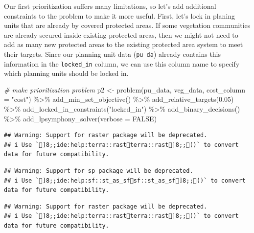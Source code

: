 \documentclass[
  12pt,
]{book}
\newenvironment{Shaded}{\begin{snugshade}}{\end{snugshade}}
\newcommand{\AttributeTok}[1]{\textcolor[rgb]{0.77,0.63,0.00}{#1}}
\newcommand{\CommentTok}[1]{\textcolor[rgb]{0.56,0.35,0.01}{\textit{#1}}}
\newcommand{\ConstantTok}[1]{\textcolor[rgb]{0.00,0.00,0.00}{#1}}
\newcommand{\FloatTok}[1]{\textcolor[rgb]{0.00,0.00,0.81}{#1}}
\newcommand{\FunctionTok}[1]{\textcolor[rgb]{0.00,0.00,0.00}{#1}}
\newcommand{\NormalTok}[1]{#1}
\newcommand{\OtherTok}[1]{\textcolor[rgb]{0.56,0.35,0.01}{#1}}
\newcommand{\SpecialCharTok}[1]{\textcolor[rgb]{0.00,0.00,0.00}{#1}}
\newcommand{\StringTok}[1]{\textcolor[rgb]{0.31,0.60,0.02}{#1}}
\begin{document}
Our first prioritization suffers many limitations, so let's add additional constraints to the problem to make it more useful. First, let's lock in planing units that are already by covered protected areas. If some vegetation communities are already secured inside existing protected areas, then we might not need to add as many new protected areas to the existing protected area system to meet their targets. Since our planning unit data (\texttt{pu\_da}) already contains this information in the \texttt{locked\_in} column, we can use this column name to specify which planning units should be locked in.

\begin{Shaded}
\begin{Highlighting}[]
\CommentTok{\# make prioritization problem}
\NormalTok{p2 }\OtherTok{\textless{}{-}} \FunctionTok{problem}\NormalTok{(pu\_data, veg\_data, }\AttributeTok{cost\_column =} \StringTok{"cost"}\NormalTok{) }\SpecialCharTok{\%\textgreater{}\%}
      \FunctionTok{add\_min\_set\_objective}\NormalTok{() }\SpecialCharTok{\%\textgreater{}\%}
      \FunctionTok{add\_relative\_targets}\NormalTok{(}\FloatTok{0.05}\NormalTok{) }\SpecialCharTok{\%\textgreater{}\%}
      \FunctionTok{add\_locked\_in\_constraints}\NormalTok{(}\StringTok{"locked\_in"}\NormalTok{) }\SpecialCharTok{\%\textgreater{}\%}
      \FunctionTok{add\_binary\_decisions}\NormalTok{() }\SpecialCharTok{\%\textgreater{}\%}
      \FunctionTok{add\_lpsymphony\_solver}\NormalTok{(}\AttributeTok{verbose =} \ConstantTok{FALSE}\NormalTok{)}
\end{Highlighting}
\end{Shaded}

\begin{verbatim}
## Warning: Support for raster package will be deprecated.
## i Use `]8;;ide:help:terra::rastterra::rast]8;;()` to convert data for future compatibility.
\end{verbatim}

\begin{verbatim}
## Warning: Support for sp package will be deprecated.
## i Use `]8;;ide:help:sf::st_as_sfsf::st_as_sf]8;;()` to convert data for future compatibility.
\end{verbatim}

\begin{verbatim}
## Warning: Support for raster package will be deprecated.
## i Use `]8;;ide:help:terra::rastterra::rast]8;;()` to convert data for future compatibility.
\end{verbatim}
\end{document}
